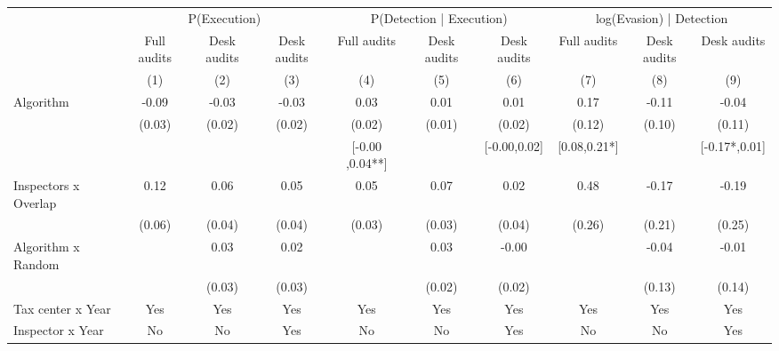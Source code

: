 \begin{tabular}{lccc|ccc|ccc} \toprule
\multicolumn{1}{l}{} & \multicolumn{3}{c}{P(Execution)} & \multicolumn{3}{c}{P(Detection | Execution)} & \multicolumn{3}{c}{log(Evasion) | Detection} \\\cmidrule(lr){2-4}\cmidrule(lr){5-7}\cmidrule(lr){8-10} \multicolumn{1}{l}{} & Full audits & Desk audits & Desk audits & Full audits & Desk audits & Desk audits & Full audits & Desk audits & Desk audits \\ \multicolumn{1}{l}{} & (1) & (2) & (3) & (4) & (5) & (6) & (7) & (8) & (9) \\ \midrule
Algorithm   &       -0.09\sym{***}&       -0.03\sym{*}  &       -0.03\sym{*}  &        0.03\sym{*}  &        0.01         &        0.01         &        0.17         &       -0.11         &       -0.04         \\
            &      (0.03)         &      (0.02)         &      (0.02)         &      (0.02)         &      (0.01)         &      (0.02)         &      (0.12)         &      (0.10)         &      (0.11)         \\
\addlinespace
 & & & & [-0.00 ,0.04**] & & [-0.00,0.02] & [0.08,0.21*] & & [-0.17*,0.01] \\  Inspectors x Overlap&        0.12\sym{*}  &        0.06\sym{*}  &        0.05         &        0.05         &        0.07\sym{*}  &        0.02         &        0.48\sym{*}  &       -0.17         &       -0.19         \\
            &      (0.06)         &      (0.04)         &      (0.04)         &      (0.03)         &      (0.03)         &      (0.04)         &      (0.26)         &      (0.21)         &      (0.25)         \\
\addlinespace
Algorithm x Random&                     &        0.03         &        0.02         &                     &        0.03         &       -0.00         &                     &       -0.04         &       -0.01         \\
            &                     &      (0.03)         &      (0.03)         &                     &      (0.02)         &      (0.02)         &                     &      (0.13)         &      (0.14)         \\
\midrule
Tax center x Year&         Yes         &         Yes         &         Yes         &         Yes         &         Yes         &         Yes         &         Yes         &         Yes         &         Yes         \\
Inspector x Year&          No         &          No         &         Yes         &          No         &          No         &         Yes         &          No         &          No         &         Yes         \\

\end{tabular}
